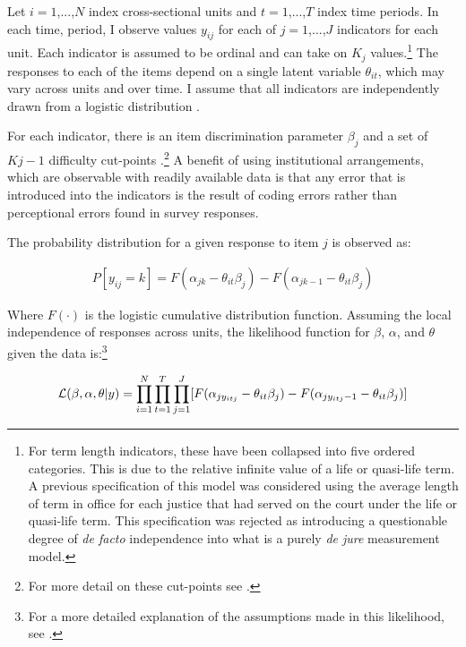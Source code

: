 \documentclass[12pt]{article}
\begin{document}
Let $i=1$,...,$N$ index cross-sectional units and $t=1$,...,$T$ index time periods.  In each time, period, I observe values $y_{ij}$ for each of $j=1$,...,$J$ indicators for each unit.  Each indicator is assumed to be ordinal and can take on $K_j$ values.\footnote{For term length indicators, these have been collapsed into five ordered categories.  This is due to the relative infinite value of a life or quasi-life term.  A previous specification of this model was considered using the average length of term in office for each justice that had served on the court under the life or quasi-life term.  This specification was rejected as introducing a questionable degree of \textit{de facto} independence into what is a purely \textit{de jure} measurement model.}  The responses to each of the items depend on a single latent variable $\theta_{it}$, which may vary across units and over time. I assume that all indicators are independently drawn from a logistic distribution \citep[7]{Schnakenberg2014}. 

For each indicator, there is an item discrimination parameter $\beta_j$ and a set of $Kj-1$ difficulty cut-points \citep[7]{Schnakenberg2014}.\footnote{For more detail on these cut-points see \citep{Treier2008,Schnakenberg2014}.}  A benefit of using institutional arrangements, which are observable with readily available data is that any error that is introduced into the indicators is the result of coding errors rather than perceptional errors found in survey responses.  

The probability distribution for a given response to item $j$ is observed as:

\begin{align}
P[y_{ij}=k]=F(\alpha_{jk}-\theta_{it}\beta_j)-F(\alpha_{jk-1}-\theta_{it}\beta_j)
\end{align} 

Where $F(\cdot)$ is the logistic cumulative distribution function.  Assuming the local independence of responses across units, the likelihood function for $\beta$, $\alpha$, and $\theta$ given the data is:\footnote{For a more detailed explanation of the assumptions made in this likelihood, see \citep[8]{Schnakenberg2014}.}

\begin{align}\label{like}
{\cal L} (\beta,\alpha,\theta|y)=\prod_{i=1}^{N}\prod_{t=1}^{T}\prod_{j=1}^{J}[F(\alpha_{jy_{itj}}-\theta_{it}\beta_j)-F(\alpha_{jy_{itj}-1}-\theta_{it}\beta_j)]
\end{align} 
\end{document}
